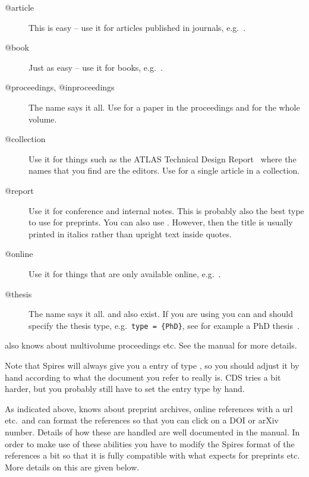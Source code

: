 \begin{description}
\item[@article] This is easy -- use it for articles published in
  journals, e.g.~\cite{Abramowicz:2010ih}.
\item[@book] Just as easy -- use it for books, e.g.~\cite{kopka04}.
\item[@proceedings, @inproceedings] The name says it all. Use
   for a paper in the proceedings and
   for the whole volume.
\item[@collection] Use it for things such as the ATLAS Technical Design
  Report~\cite{lhc:vol1} where the names that you find are the
  editors. Use  for a single article in a
  collection.
\item[@report] Use it for conference and
  internal notes. This is
  probably also the best type to use for preprints. You can also use
  . However, then the title is usually printed in
  italics rather than upright text inside quotes.
\item[@online] Use it for things that are only available online,
  e.g.~\cite{lshort}.
\item[@thesis] The name says it all.
    and
  also exist. If you are using  you can and should specify
  the thesis type, e.g.\ \texttt{type = \{PhD\}}, see for example a
  PhD thesis~\cite{tlodd:2012}.
\end{description}

 also knows about multivolume proceedings etc. See
the manual for more details.

Note that Spires will always give you a \BibTeX{} entry of type
, so you should adjust it by hand according to what
the document you refer to really is. CDS tries a bit harder, but you
probably still have to set the entry type by hand.

As indicated above,  knows about preprint archives,
online references with a url etc.\ and can format the references so
that you can click on a DOI or arXiv number. Details of how these are
handled are well documented in the manual.  In order to make use of
these abilities you have to modify the Spires format of the references
a bit so that it is fully compatible with what 
expects for preprints etc. More details on this are given below.

